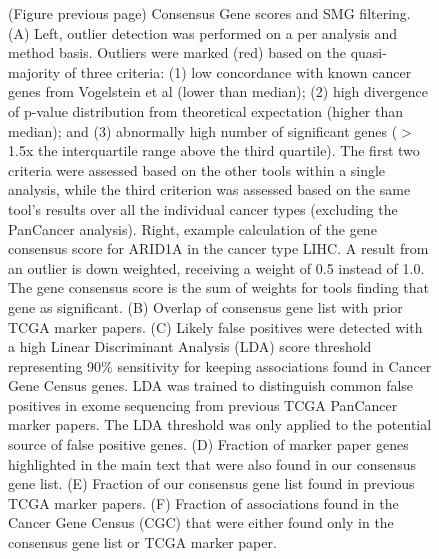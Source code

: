 \begin{figure} [t!]
  \caption[(continued) Consensus Gene scores and SMG filtering.]{(Figure previous page) Consensus Gene scores and SMG filtering. (A) Left, outlier detection was performed on a per analysis and method basis. Outliers were marked (red) based on the quasi-majority of three criteria: (1) low concordance with known cancer genes from Vogelstein et al (lower than median); (2) high divergence of p-value distribution from theoretical expectation (higher than median); and (3) abnormally high number of significant genes ($>$1.5x the interquartile range above the third quartile). The first two criteria were assessed based on the other tools within a single analysis, while the third criterion was assessed based on the same tool's results over all the individual cancer types (excluding the PanCancer analysis). Right, example calculation of the gene consensus score for ARID1A in the cancer type LIHC. A result from an outlier is down weighted, receiving a weight of 0.5 instead of 1.0. The gene consensus score is the sum of weights for tools finding that gene as significant. (B) Overlap of consensus gene list with prior TCGA marker papers. (C) Likely false positives were detected with a high Linear Discriminant Analysis (LDA) score threshold representing 90\% sensitivity for keeping associations found in Cancer Gene Census genes. LDA was trained to distinguish common false positives in exome sequencing from previous TCGA PanCancer marker papers. The LDA threshold was only applied to the potential source of false positive genes. (D) Fraction of marker paper genes highlighted in the main text that were also found in our consensus gene list. (E) Fraction of our consensus gene list found in previous TCGA marker papers.  (F) Fraction of associations found in the Cancer Gene Census (CGC) that were either found only in the consensus gene list or TCGA marker paper. }
\end{figure}

